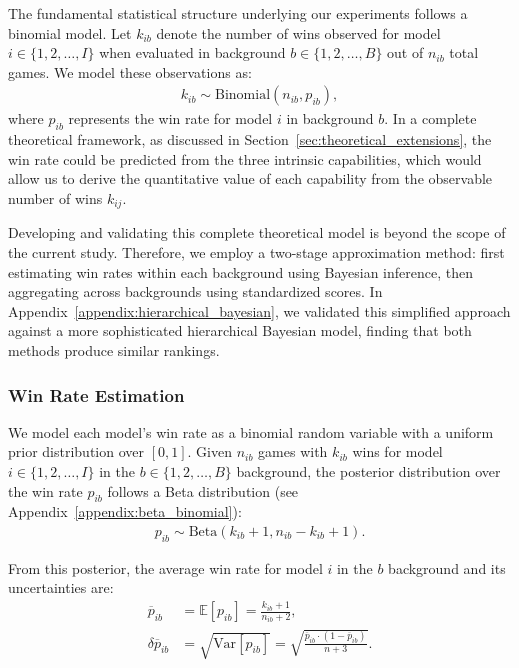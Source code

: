\documentclass{article}
\begin{document}
The fundamental statistical structure underlying our experiments follows a binomial model. Let $k_{ib}$ denote the number of wins observed for model $i\in\{1,2,\dots,I\}$ when evaluated in background $b\in\{1,2,\dots,B\}$ out of $n_{ib}$ total games. We model these observations as:
\begin{align}
    k_{ib} \sim \text{Binomial}(n_{ib}, p_{ib}),
\end{align}
where $p_{ib}$ represents the win rate for model $i$ in background $b$. In a complete theoretical framework, as discussed in Section~\ref{sec:theoretical_extensions}, the win rate could be predicted from the three intrinsic capabilities, which would allow us to derive the quantitative value of each capability from the observable number of wins $k_{ij}$.

Developing and validating this complete theoretical model is beyond the scope of the current study. Therefore, we employ a two-stage approximation method: first estimating win rates within each background using Bayesian inference, then aggregating across backgrounds using standardized scores. In Appendix~\ref{appendix:hierarchical_bayesian}, we validated this simplified approach against a more sophisticated hierarchical Bayesian model, finding that both methods produce similar rankings.

\subsubsection{Win Rate Estimation}
\label{sec:win_rate_estimation}

We model each model's win rate as a binomial random variable with a uniform prior distribution over $[0,1]$. Given $n_{ib}$ games with $k_{ib}$ wins for model $i\in\{1,2,\dots,I\}$ in the $b\in\{1,2,\dots,B\}$ background, the posterior distribution over the win rate $p_{ib}$ follows a Beta distribution (see Appendix~\ref{appendix:beta_binomial}):
\begin{align}
p_{ib}\sim \text{Beta}(k_{ib} + 1, n_{ib} - k_{ib} + 1).
\end{align}

From this posterior, the average win rate for model $i$ in the $b$ background and its uncertainties are:
\begin{align}
\overline{p}_{ib} & = \mathbb{E}[p_{ib}] = \frac{k_{ib} + 1}{n_{ib} + 2} \label{winrate},\\
\delta\overline{p}_{ib} & =\sqrt{\textrm{Var}[p_{ib}]} = \sqrt{\frac{\overline{p}_{ib} \cdot (1 - \overline{p}_{ib})}{n + 3}}.
\label{uncertainty}
\end{align}
\end{document}
